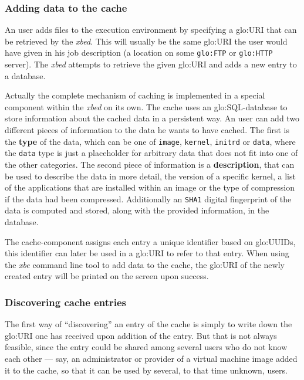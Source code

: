 \subsubsection{Adding data to the cache}

An  user  adds  files  to   the  execution  environment  by  specifying  a
\gls{glo:URI} that can be retrieved by the \emph{xbed}.  This will usually
be the same \gls{glo:URI} the user would have given in his job description
(\eg a location  on some \texttt{\gls{glo:FTP}} or \texttt{\gls{glo:HTTP}}
server).  The \emph{xbed} attempts to retrieve the given \gls{glo:URI} and
adds a new entry to a database.

Actually the  complete mechanism  of caching is  implemented in  a special
component  within  the  \emph{xbed}  on   its  own.   The  cache  uses  an
\gls{glo:SQL}-database  to store information  about the  cached data  in a
persistent way. An user can add two different pieces of information to the
data he wants to have cached.  The first is the \textbf{type} of the data,
which can  be one  of \texttt{image}, \texttt{kernel},  \texttt{initrd} or
\texttt{data},  where the  \texttt{data} type  is just  a  placeholder for
arbitrary data  that does not fit  into one of the  other categories.  The
second piece of information is a \textbf{description}, that can be used to
describe the data in more detail,  \eg the version of a specific kernel, a
list of the applications that are installed within an image or the type of
compression   if  the   data   had  been   compressed.   Additionally   an
\texttt{SHA1}  digital fingerprint  of the  data is  computed  and stored,
along with the provided information, in the database.

The  cache-component  assigns each  entry  a  unique  identifier based  on
\gls{glo:UUID}s, this identifier  can later be used in  a \gls{glo:URI} to
refer to that  entry.  When using the \emph{xbe} command  line tool to add
data to  the cache, the \gls{glo:URI}  of the newly created  entry will be
printed on the screen upon success.

\subsubsection{Discovering cache entries}

The first way of ``discovering'' an  entry of the cache is simply to write
down the  \gls{glo:URI} one has received  upon addition of  the entry. But
that is not always feasible, since the entry could be shared among several
users who do not know each  other --- say, an administrator or provider of
a virtual machine image  added it to the cache, so that  it can be used by
several, to that time unknown, users.

